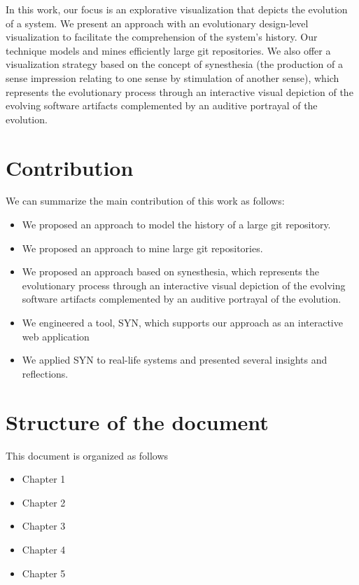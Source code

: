 In this work, our focus is an explorative visualization that depicts the evolution of a system.
We present an approach with an evolutionary design-level visualization to facilitate the comprehension of the system's history. 
Our technique models and mines efficiently large git repositories. We also offer a visualization strategy based on the concept of synesthesia 
(the production of a sense impression relating to one sense by stimulation of another sense), 
which represents the evolutionary process through an interactive visual depiction of the evolving software artifacts complemented by an auditive portrayal of the evolution. 

\section{Contribution}
We can summarize the main contribution of this work as follows:
\begin{itemize}
 \item We proposed an approach to model the history of a large git repository.
 \item We proposed an approach to mine large git repositories.
 \item We proposed an approach based on synesthesia, which represents the evolutionary process through an interactive visual depiction of the evolving software artifacts complemented by an auditive portrayal of the evolution.
 \item We engineered a tool, SYN, which supports our approach as an interactive web application
 \item We applied SYN to real-life systems and presented several insights and reflections. 
\end{itemize}

\section{Structure of the document}
This document is organized as follows
\begin{itemize}
 \item {Chapter 1}
 \item {Chapter 2}
 \item {Chapter 3}
 \item {Chapter 4}
 \item {Chapter 5}

\end{itemize}